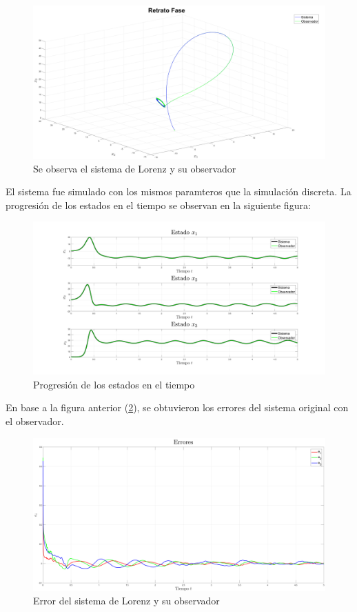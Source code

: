 \begin{figure}[H]
	\centering
	\includegraphics[width=150mm]{img/E1_RetratoFase_Cont.png}
	\caption{Se observa el sistema de Lorenz y su observador}
	\label{img:lorenzD4}
\end{figure}

El sistema fue simulado con los mismos paramteros que la simulación discreta. La progresión de los estados en el tiempo se observan en la siguiente figura:

\begin{figure}[H]
	\centering
	\includegraphics[width=150mm]{img/E1_Estados_Cont.png}
	\caption{Progresión de los estados en el tiempo}
	\label{img:lorenzD5}
\end{figure}

En base a la figura anterior (\ref{img:lorenzD5}), se obtuvieron los errores del sistema original con el observador.

\begin{figure}[H]
	\centering
	\includegraphics[width=150mm]{img/E1_Errores_Cont.png}
	\caption{Error del sistema de Lorenz y su observador}
	\label{img:lorenzD6}
\end{figure}

